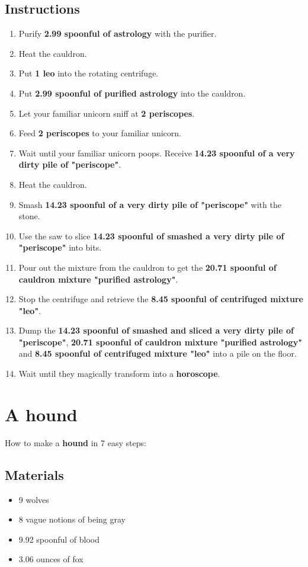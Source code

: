 \documentclass{article}
\begin{document}
\subsection{Instructions}\begin{enumerate}
\item 
Purify \textbf{2.99 spoonful of astrology} with the purifier.
\item 
Heat the cauldron.
\item 
Put \textbf{1 leo} into the rotating centrifuge.
\item 
Put \textbf{2.99 spoonful of purified astrology} into the cauldron.
\item 
Let your familiar unicorn sniff at \textbf{2 periscopes}.
\item 
Feed \textbf{2 periscopes} to your familiar unicorn.
\item 
Wait until your familiar unicorn poops. Receive \textbf{14.23 spoonful of a very dirty pile of "periscope"}.
\item 
Heat the cauldron.
\item 
Smash \textbf{14.23 spoonful of a very dirty pile of "periscope"} with the stone.
\item 
Use the saw to slice \textbf{14.23 spoonful of smashed a very dirty pile of "periscope"} into bits.
\item 
Pour out the mixture from the cauldron to get the \textbf{20.71 spoonful of cauldron mixture "purified astrology"}.
\item 
Stop the centrifuge and retrieve the \textbf{8.45 spoonful of centrifuged mixture "leo"}.
\item 
Dump the \textbf{14.23 spoonful of smashed and sliced a very dirty pile of "periscope"}, \textbf{20.71 spoonful of cauldron mixture "purified astrology"} and \textbf{8.45 spoonful of centrifuged mixture "leo"} into a pile on the floor.
\item 
Wait until they magically transform into a \textbf{horoscope}.
\end{enumerate}
\newpage
\section{A hound}How to make a \textbf{hound} in 7 easy steps:

\subsection{Materials}\begin{itemize}
\item 
9 wolves
\item 
8 vague notions of being gray
\item 
9.92 spoonful of blood
\item 
3.06 ounces of fox
\end{itemize}
\end{document}
